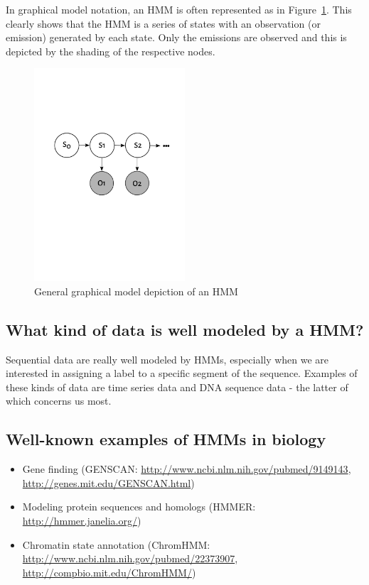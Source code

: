 \documentclass[11pt, oneside]{article}
\begin{document}
In graphical model notation, an HMM is often represented as in Figure~\ref{fig:pgm}. This clearly shows that the HMM is a series of states with an observation (or emission) generated by each state. Only the emissions are observed and this is depicted by the shading of the respective nodes.

\begin{figure}[H]
\centering
\includegraphics[width=0.5\textwidth]{../figures/hmmTemplate.pdf}
\caption{General graphical model depiction of an HMM}
\label{fig:pgm}
\end{figure}

\subsection{What kind of data is well modeled by a HMM?}
Sequential data are really well modeled by HMMs, especially when we are interested in assigning a label to a specific segment of the sequence. Examples of these kinds of data are time series data and DNA sequence data - the latter of which concerns us most. 

\subsection{Well-known examples of HMMs in biology}

\begin{itemize}
\item Gene finding (GENSCAN: \url{http://www.ncbi.nlm.nih.gov/pubmed/9149143}, \url{http://genes.mit.edu/GENSCAN.html})
\item Modeling protein sequences and homologs (HMMER: \url{http://hmmer.janelia.org/})
\item Chromatin state annotation (ChromHMM: \url{http://www.ncbi.nlm.nih.gov/pubmed/22373907}, \url{http://compbio.mit.edu/ChromHMM/})
\end{itemize}
\end{document}
